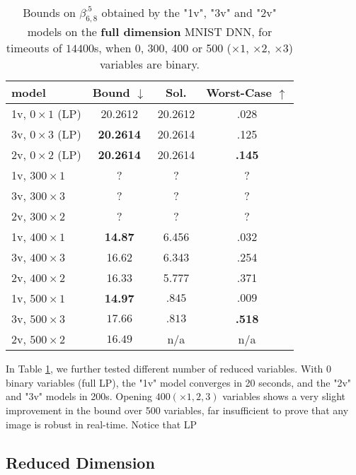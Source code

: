 \begin{table}[h!]
		\centering
	\begin{tabular}{||l||c|c|c||}\hline\hline
		model &        Bound $\downarrow$ &  Sol. &      Worst-Case $\uparrow$ \\\hline \hline
		1v, $0 \times 1$ (LP) & 20.2612  & 20.2612  & .028 \\\hline 
		3v, $0 \times 3$ (LP) & {\bf 20.2614}  & 20.2614  & .125 \\\hline 
	    2v, $0 \times 2$ (LP) & {\bf 20.2614}  & 20.2614  & {\bf .145} \\\hline\hline	 

		1v, $300 \times 1$ & ? & ? & ? \\\hline 
		3v, $300 \times 3$ & ? & ? & ? \\\hline 
	    2v, $300 \times 2$ & ? & ? & ? \\\hline\hline	 

		1v, $400 \times 1$ & {\bf 14.87} & 6.456 & .032 \\\hline 
		3v, $400 \times 3$ & 16.62 & 6.343 & .254 \\\hline 
	    2v, $400 \times 2$ & 16.33 & 5.777 & .371 \\\hline \hline

		1v, $500 \times 1$ & {\bf 14.97} & $.845$ & $.009$ \\\hline 
		3v, $500 \times 3$ & $17.66$ & $.813$ & {\bf .518} \\\hline 
	    2v, $500 \times 2$ & $16.49$ & n/a & n/a \\\hline\hline	 
	\end{tabular}
	\caption{Bounds on $\beta^{.5}_{6,8}$ 
	obtained by the "1v", "3v" and "2v" models 
	on the {\bf full dimension} MNIST DNN, 
	for timeouts of $14400$s, when 0, 300, 400 or 500 ($\times 1$, $\times 2$, $\times 3$) variables are binary.}
	\label{table.mnist}
\end{table}

In Table \ref{table.mnist}, we further tested different number of reduced variables. 
With 0 binary variables (full LP), the "1v" model converges in 20 seconds, and the "2v" and "3v" models in 200s.
Opening $400 (\times 1,2,3)$ variables shows a very slight improvement in the bound over 500 variables, 
far insufficient to prove that any image is robust in real-time. Notice that LP

\subsection{Reduced Dimension}


